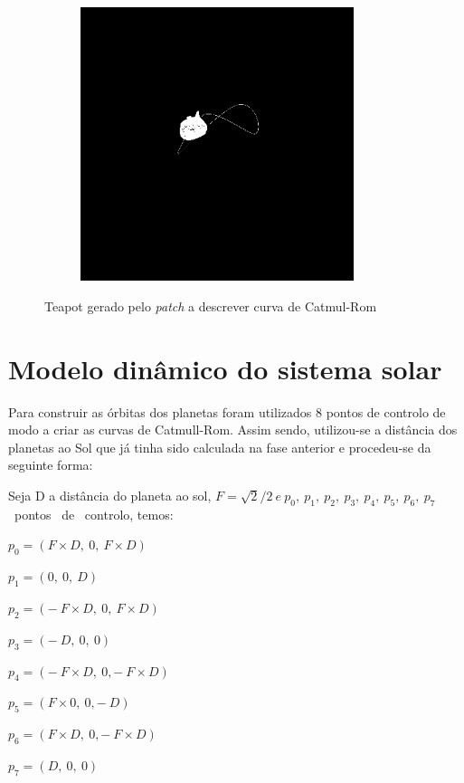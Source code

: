 \documentclass[11pt,a4paper]{report}
\begin{document}
\begin{figure}[H]
\begin{subfigure}{0.5\textwidth}
  \caption{\texttt{}}
  \label{fig:catmul_teapot1}
\end{subfigure}%
\begin{subfigure}{0.5\textwidth}
  \centering
  \includegraphics[width = 8cm,height = 8cm]{catmul_teapot4.png}
  \caption{\texttt{}}
  \label{fig:catmul_teapot1}
\end{subfigure}
\label{fig:teapots}
\caption{Teapot gerado pelo  \textit{patch} a descrever curva de Catmul-Rom}
\end{figure}

\newpage

\section{Modelo dinâmico do sistema solar}
Para construir as órbitas dos planetas foram utilizados 8 pontos de controlo de modo a criar as curvas de Catmull-Rom. Assim sendo, utilizou-se a distância dos planetas ao Sol que já tinha sido calculada na fase anterior e procedeu-se da seguinte forma:
\par
Seja  D a distância do planeta ao sol, $F = \sqrt{2}/2 \ e \ {p_0},\ {p_1},\ {p_2},\ {p_3},\ {p_4},\ {p_5},\ {p_6},\ {p_7}$ \ pontos \ de \ controlo, temos:
\par
{$p_0 = (F \times D, \ 0,\ F \times D)$}
\par
{$p_1 = (0, \ 0, \ D)$}
\par
{$p_2 = (- \ F \times D,\ 0,\ F \times D)$}
\par
{$p_3 = (- \ D,\ 0,\ 0)$}
\par
{$p_4 = (- \ F \times D,\ 0, - \ F \times D)$}
\par
{$p_5 = (F \times 0,\ 0, - \ D)$}
\par
{$p_6 = (F \times D,\ 0, - \ F \times D)$}
\par
{$p_7 = (D,\ 0,\ 0)$}
\end{document}

